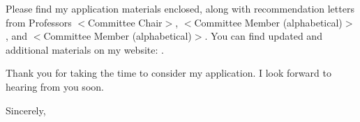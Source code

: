 \documentclass{article}
\begin{document}

\teaching


\desire


Please find my application materials enclosed, along with recommendation letters
from Professors
$<$Committee Chair$>$,
\fourthLOR
$<$Committee Member (alphabetical)$>$, and
$<$Committee Member (alphabetical)$>$.
You can find updated and additional materials on my website: \mywebsite.

Thank you for taking the time to consider my application.
I look forward to hearing from you soon.

\customCLskip

Sincerely,

\smallskip

\myname
\end{document}

